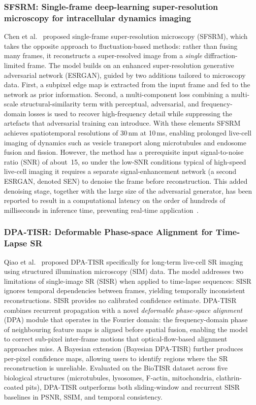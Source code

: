 \subsubsection{SFSRM: Single-frame deep-learning super-resolution microscopy for intracellular dynamics imaging}
Chen et al.~\cite{chen2023sfsrm} proposed single-frame super-resolution microscopy (SFSRM),
which takes the opposite approach to fluctuation-based methods: rather than fusing many frames,
it reconstructs a super-resolved image from a \emph{single} diffraction-limited frame.
The model builds on an enhanced super-resolution generative adversarial network (ESRGAN),
guided by two additions tailored to microscopy data.
First, a subpixel edge map is extracted from the input frame and fed to the network as prior
information.
Second, a multi-component loss combining a multi-scale structural-similarity term with perceptual,
adversarial, and frequency-domain losses is used to recover high-frequency detail while suppressing
the artefacts that adversarial training can introduce.
With these elements SFSRM achieves spatiotemporal resolutions of 30\,nm at 10\,ms,
enabling prolonged live-cell imaging of dynamics such as vesicle transport along microtubules
and endosome fusion and fission.
However, the method has a prerequisite input signal-to-noise ratio (SNR) of about~15, so under the
low-SNR conditions typical of high-speed live-cell imaging it requires a separate signal-enhancement
network (a second ESRGAN, denoted SEN) to denoise the frame before reconstruction.
This added denoising stage, together with the large size of the adversarial generator, has been
reported to result in a computational latency on the order of hundreds of milliseconds in inference
time, preventing real-time application~\cite{resurf2024}.

\subsubsection{DPA-TISR: Deformable Phase-space Alignment for Time-Lapse SR}

Qiao et al.~\cite{qiao2025dpatisr} proposed DPA-TISR specifically for long-term live-cell SR 
imaging using structured illumination microscopy (SIM) data. 
The model addresses two limitations of single-image SR (SISR) when applied to time-lapse sequences: 
SISR ignores temporal dependencies between frames, yielding temporally inconsistent reconstructions. 
SISR provides no calibrated confidence estimate. DPA-TISR combines recurrent propagation with a novel 
\emph{deformable phase-space alignment} (DPA) module that operates in the Fourier domain: 
the frequency-domain phase of neighbouring feature maps is aligned before spatial fusion, 
enabling the model to correct sub-pixel inter-frame motions that optical-flow-based alignment 
approaches miss. A Bayesian extension (Bayesian DPA-TISR) further produces per-pixel confidence 
maps, allowing users to identify regions where the SR reconstruction is unreliable. 
Evaluated on the BioTISR dataset across five biological structures 
(microtubules, lysosomes, F-actin, mitochondria, clathrin-coated pits), DPA-TISR outperforms both 
sliding-window and recurrent SISR baselines in PSNR, SSIM, and temporal consistency.

